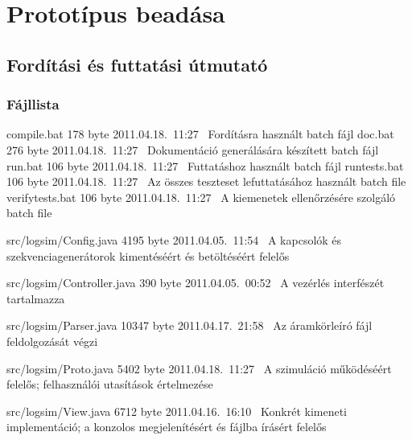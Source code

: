%
\chapter{Prototípus beadása}

\thispagestyle{fancy}

\section{Fordítási és futtatási útmutató}

\subsection{Fájllista}

\begin{fajllista}

\fajl
{compile.bat} %
{178 byte} %
{2011.04.18.~11:27~} %
{Fordításra használt batch fájl} %
\fajl
{doc.bat} %
{276 byte} %
{2011.04.18.~11:27~} %
{Dokumentáció generálására készített batch fájl} %
\fajl
{run.bat} %
{106 byte} %
{2011.04.18.~11:27~} %
{Futtatáshoz használt batch fájl} %
\fajl
{runtests.bat} %
{106 byte} %
{2011.04.18.~11:27~} %
{Az összes teszteset lefuttatásához használt batch file} %
\fajl
{verifytests.bat} %
{106 byte} %
{2011.04.18.~11:27~} %
{A kiemenetek ellenőrzésére szolgáló batch file} %

\fajl
{src/logsim/Config.java} %
{4195 byte} %
{2011.04.05.~11:54~} %
{A kapcsolók és szekvenciagenerátorok kimentéséért és betöltéséért felelős} %

\fajl
{src/logsim/Controller.java} %
{390 byte} %
{2011.04.05.~00:52~} %
{A vezérlés interfészét tartalmazza} %

\fajl
{src/logsim/Parser.java} %
{10347 byte} %
{2011.04.17.~21:58~} %
{Az áramkörleíró fájl feldolgozását végzi} %

\fajl
{src/logsim/Proto.java} %
{5402 byte} %
{2011.04.18.~11:27~} %
{A szimuláció működéséért felelős; felhasználói utasítások értelmezése} %

\fajl
{src/logsim/View.java} %
{6712 byte} %
{2011.04.16.~16:10~} %
{Konkrét kimeneti implementáció; a konzolos megjelenítésért és fájlba írásért felelős} %


\end{fajllista}
